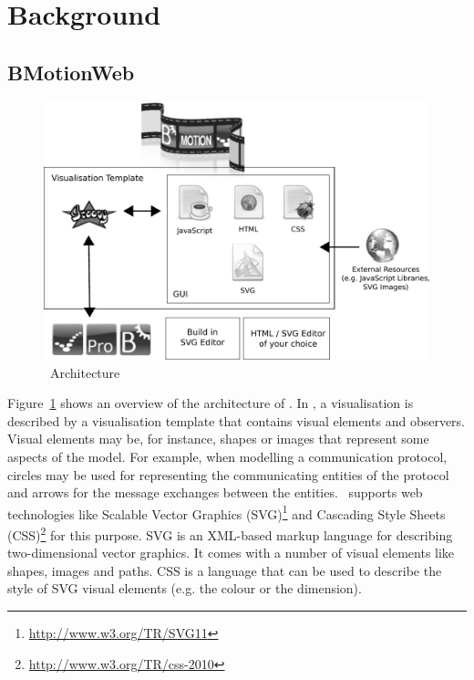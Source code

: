 \documentclass[twoside,10pt]{book}
\begin{document}
\section{Background}

\subsection{BMotionWeb}

\begin{figure}[!ht]
\begin{center}
	\includegraphics[width=14cm]{img/tutorial/bms_architecture}
	\caption{\bms~Architecture}
	\label{fig_tut_00_architecture}
\end{center}
\end{figure}

Figure~\ref{fig_tut_00_architecture} shows an overview of the architecture of \bms.
In \bms, a visualisation is described by a visualisation template that contains visual elements and observers.
Visual elements may be, for instance, shapes or images that represent some aspects of the model.
For example, when modelling a communication protocol, circles may be used for representing the communicating entities of the protocol and arrows for the message exchanges between the entities.
\bms~supports web technologies like Scalable Vector Graphics (SVG)\footnote{\url{http://www.w3.org/TR/SVG11}} and Cascading Style Sheets (CSS)\footnote{\url{http://www.w3.org/TR/css-2010}} for this purpose.
SVG is an XML-based markup language for describing two-dimensional vector graphics.
It comes with a number of visual elements like shapes, images and paths.
CSS is a language that can be used to describe the style of SVG visual elements (e.g. the colour or the dimension).
\end{document}
